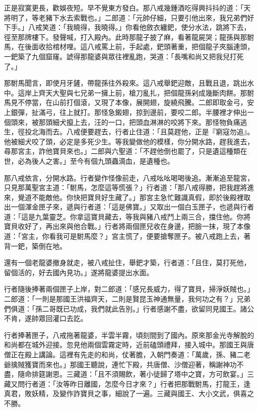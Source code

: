 正是寂寞更長，歡娛夜短。早不覺東方發白。那八戒幾鍾酒吃得興抖抖的道：「天將明了，等老豬下水去索戰也。」二郎道：「元帥仔細，只要引他出來，我兄弟們好下手。」八戒笑道：「我曉得，我曉得。」你看他斂衣纏鈀，使分水法，跳將下去，徑至那牌樓下。發聲喊，打入殿內。此時那龍子披了麻，看著龍屍哭；龍孫與那駙馬，在後面收拾棺材哩。這八戒罵上前，手起處，鈀頭著重，把個龍子夾腦連頭，一鈀築了九個窟窿。諕得那龍婆與眾往裡亂跑，哭道：「長嘴和尚又把我兒打死了。」

那駙馬聞言，即使月牙鏟，帶龍孫往外殺來。這八戒舉鈀迎敵，且戰且退，跳出水中。這岸上齊天大聖與七兄弟一擁上前，槍刀亂扎，把個龍孫剁成幾斷肉餅。那駙馬見不停當，在山前打個滾，又現了本像，展開翅，旋繞飛騰。二郎即取金弓，安上銀彈，扯滿弓，往上就打。那怪急鎩翅，掠到邊前，要咬二郎。半腰裡才伸出一個頭來，被那頭細犬攛上去，汪的一口，把頭血淋淋的咬將下來。那怪物負痛逃生，徑投北海而去。八戒便要趕去，行者止住道：「且莫趕他，正是『窮寇勿追』。他被細犬咬了頭，必定是多死少生。等我變做他的模樣，你分開水路，趕我進去，尋那宮主，詐他寶貝來也。」二郎與六聖道：「不趕他倒也罷了，只是遺這種類在世，必為後人之害。」至今有個九頭蟲滴血，是遺種也。

那八戒依言，分開水路。行者變作怪像前走，八戒吆吆喝喝後追。漸漸追至龍宮，只見那萬聖宮主道：「駙馬，怎麼這等慌張？」行者道：「那八戒得勝，把我趕將進來，覺道不能敵他。你快把寶貝好生藏了。」那宮主急忙難識真假，即於後殿裡取出一個渾金匣子來，遞與行者道：「這是佛寶。」又取出一個白玉匣子，也遞與行者道：「這是九葉靈芝。你拿這寶貝藏去，等我與豬八戒鬥上兩三合，擋住他。你將寶貝收好了，再出來與他合戰。」行者將兩個匣兒收在身邊，把臉一抹，現了本像道：「宮主，你看我可是駙馬麼？」宮主慌了，便要搶奪匣子。被八戒跑上去，著背一鈀，築倒在地。

還有一個老龍婆撤身就走，被八戒扯住，舉鈀才築，行者道：「且住，莫打死他，留個活的，好去國內見功。」遂將龍婆提出水面。

行者隨後捧著兩個匣子上岸，對二郎道：「感兄長威力，得了寶貝，掃淨妖賊也。」二郎道：「一則是那國王洪福齊天，二則是賢昆玉神通無量，我何功之有？」兄弟們俱道：「孫二哥既已功成，我們就此告別。」行者感謝不盡，欲留同見國王。諸公不肯，遂帥眾回灌口去訖。

行者捧著匣子，八戒拖著龍婆，半雲半霧，頃刻間到了國內。原來那金光寺解脫的和尚都在城外迎接。忽見他兩個雲霧定時，近前磕頭禮拜，接入城中。那國王與唐僧正在殿上講論。這裡有先走的和尚，仗著膽，入朝門奏道：「萬歲，孫、豬二老爺擒賊獲寶而來也。」那國王聽說，連忙下殿，共唐僧、沙僧迎著，稱謝神功不盡，隨命排筵謝恩。三藏道：「且不須賜飲，著小徒歸了塔中之寶，方可飲宴。」三藏又問行者道：「汝等昨日離國，怎麼今日才來？」行者把那戰駙馬，打龍王，逢真君，敗妖精，及變作詐寶貝之事，細說了一遍。三藏與國王、大小文武，俱喜之不勝。

